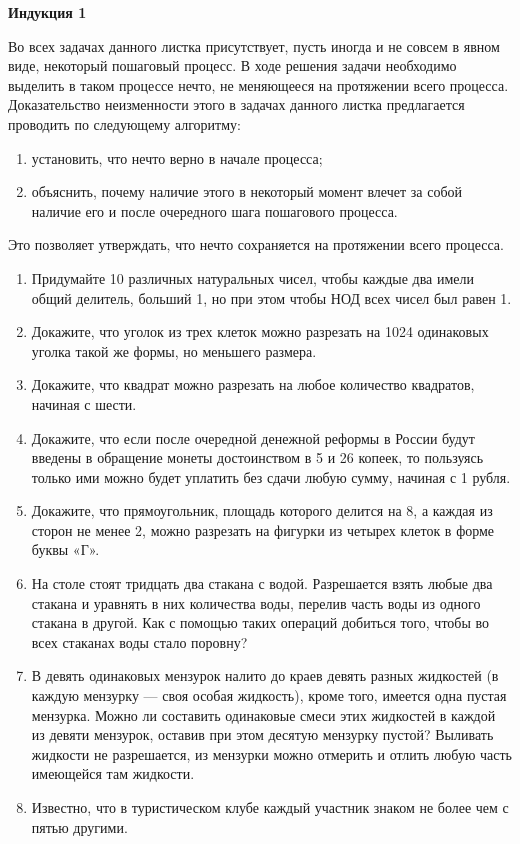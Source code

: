 \centerline{\bf \large Индукция 1}
Во всех задачах данного листка присутствует, пусть иногда и не совсем в явном виде, некоторый
пошаговый процесс. В ходе решения задачи необходимо выделить в таком процессе нечто, не меняющееся
на протяжении всего процесса. Доказательство неизменности этого в задачах данного листка
предлагается проводить по следующему алгоритму:
\begin{enumerate}
\item установить, что нечто верно в начале процесса;
\item объяснить, почему наличие этого в некоторый момент влечет за собой наличие его и после очередного
шага пошагового процесса.
\end{enumerate}
Это позволяет утверждать, что нечто сохраняется на протяжении всего процесса.
\begin{enumerate}
\item Придумайте 10 различных натуральных чисел, чтобы каждые два имели общий делитель, больший 1, но
при этом чтобы НОД всех чисел был равен 1.
\item Докажите, что уголок из трех клеток можно разрезать на 1024 одинаковых уголка такой же формы, но
меньшего размера.
\item Докажите, что квадрат можно разрезать на любое количество квадратов, начиная с шести.
\item Докажите, что если после очередной денежной реформы в России будут введены в обращение
монеты достоинством в 5 и 26 копеек, то пользуясь только ими можно будет уплатить без сдачи любую
сумму, начиная с 1 рубля.
\item Докажите, что прямоугольник, площадь которого делится на 8, а каждая из сторон не менее 2,
можно разрезать на фигурки из четырех клеток в форме буквы «Г».
\item На столе стоят тридцать два стакана с водой. Разрешается взять любые два стакана и уравнять
в них количества воды, перелив часть воды из одного стакана в другой. Как с помощью таких операций
добиться того, чтобы во всех стаканах воды стало поровну?
\item В девять одинаковых мензурок налито до краев девять разных жидкостей (в каждую мензурку —
своя особая жидкость), кроме того, имеется одна пустая мензурка. Можно ли составить одинаковые смеси
этих жидкостей в каждой из девяти мензурок, оставив при этом десятую мензурку пустой? Выливать
жидкости не разрешается, из мензурки можно отмерить и отлить любую часть имеющейся там жидкости.
\item Известно, что в туристическом клубе каждый участник знаком не более чем с пятью другими.

\end{enumerate}
